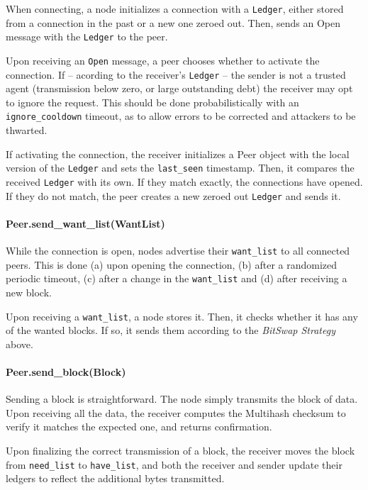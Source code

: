 \documentclass{sig-alternate}
\begin{document}
When connecting, a node initializes a connection with a
\texttt{Ledger}, either stored from a connection in the past or a new one
zeroed out. Then, sends an Open message with the \texttt{Ledger} to the peer.

Upon receiving an \texttt{Open} message, a peer chooses whether to activate
the connection. If -- acording to the receiver's \texttt{Ledger} -- the sender
is not a trusted agent (transmission below zero, or large outstanding debt) the
receiver may opt to ignore the request. This should be done probabilistically
with an \texttt{ignore\_cooldown} timeout, as to allow errors to be corrected
and attackers to be thwarted.

If activating the connection, the receiver initializes a Peer object with the
local version of the \texttt{Ledger} and sets the \texttt{last\_seen}
timestamp. Then, it compares the received
\texttt{Ledger} with its own. If they match exactly, the connections have
opened. If they do not match, the peer creates a new zeroed out
\texttt{Ledger} and sends it.


\paragraph{Peer.send\_want\_list(WantList)}

While the connection is open, nodes advertise their
\texttt{want\_list} to all connected peers. This is done (a) upon opening the
connection, (b) after a randomized periodic timeout, (c) after a change in
the \texttt{want\_list} and (d) after receiving a new block.

Upon receiving a \texttt{want\_list}, a node stores it. Then, it checks whether
it has any of the wanted blocks. If so, it sends them according to the
\textit{BitSwap Strategy} above.

\paragraph{Peer.send\_block(Block)}

Sending a block is straightforward. The node simply transmits the block of
data. Upon receiving all the data, the receiver computes the Multihash
checksum to verify it matches the expected one, and returns confirmation.

Upon finalizing the correct transmission of a block, the receiver moves the
block from \texttt{need\_list} to \texttt{have\_list}, and both the receiver
and sender update their ledgers to reflect the additional bytes transmitted.
\end{document}
